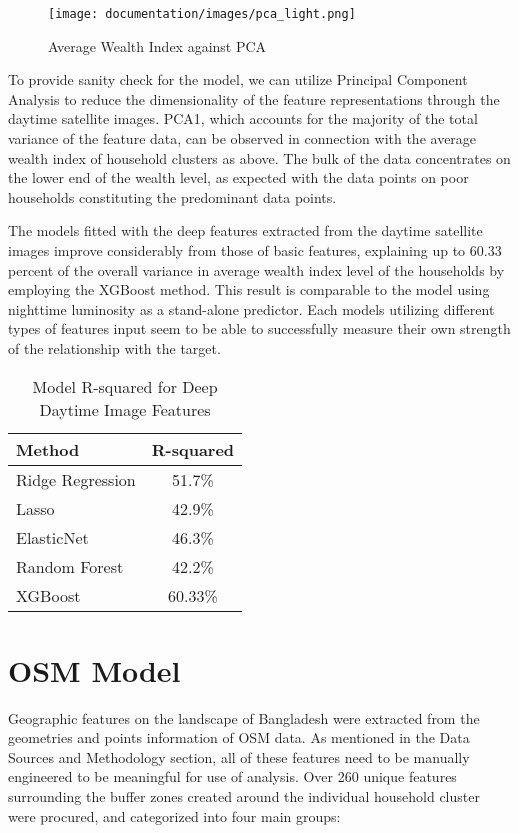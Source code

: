 \documentclass[solid,math,chem,code,plot,gloss]{bmc}
\begin{document}
\begin{figure}[hbt!]
    \centering
    \texttt{[image: documentation/images/pca\_light.png]}
    \caption{Average Wealth Index against PCA}
    \label{fig:AfD}
\end{figure}

To provide sanity check for the model, we can utilize Principal Component Analysis to reduce the dimensionality of the feature representations through the daytime satellite images. PCA1, which accounts for the majority of the total variance of the feature data, can be observed in connection with the average wealth index of household clusters as above. The bulk of the data concentrates on the lower end of the wealth level, as expected with the data points on poor households constituting the predominant data points.

The models fitted with the deep features extracted from the daytime satellite images improve considerably from those of basic features, explaining up to 60.33  percent of the overall variance in average wealth index level of the households by employing the XGBoost method. This result is comparable to the model using nighttime luminosity as a stand-alone predictor. Each models utilizing different types of features input seem to be able to successfully measure their own strength of the relationship with the target. 

\begin{table}[hbt!]
\begin{center}
\begin{tabular}{|l|c|}
\hline
Method & R-squared \\
\hline\hline\hline
Ridge Regression & 51.7\% \\
Lasso & 42.9\% \\
ElasticNet & 46.3\% \\
Random Forest & 42.2\% \\
XGBoost & 60.33\% \\
\hline
\end{tabular}
\end{center}
\label{tab:RMSEs}
\caption{Model R-squared for Deep Daytime Image Features}
\end{table}

\section{OSM Model}

Geographic features on the landscape of Bangladesh were extracted from the geometries and points information of OSM data. As mentioned in the Data Sources and Methodology section, all of these features need to be manually engineered to be meaningful for use of analysis. Over 260 unique features surrounding the buffer zones created around the individual household cluster were procured, and categorized into four main groups: 
\end{document}
